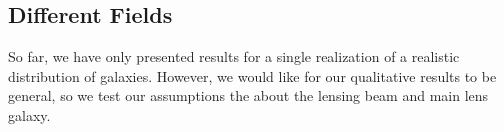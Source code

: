 \subsection{Different Fields}\label{sec:B0712}
So far, we have only presented results for a single realization of a realistic distribution of galaxies. However, we would like for our qualitative results to be general, so we test our assumptions the about the lensing beam and main lens galaxy.
  
